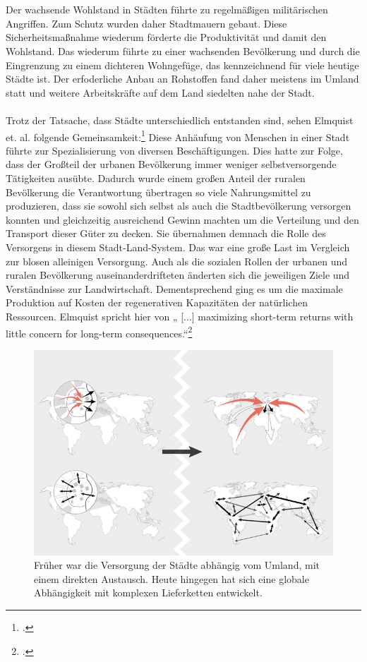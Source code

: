 \documentclass{scrartcl}
\begin{document}
\\
\\
Der wachsende Wohlstand in Städten führte zu regelmäßigen militärischen Angriffen. Zum Schutz wurden daher Stadtmauern gebaut. Diese Sicherheitsmaßnahme wiederum förderte die Produktivität und damit den Wohlstand. Das wiederum führte zu einer wachsenden Bevölkerung und durch die Eingrenzung zu einem dichteren Wohngefüge, das kennzeichnend für viele heutige Städte ist. Der erfoderliche Anbau an Rohstoffen fand daher meistens im Umland statt und weitere Arbeitskräfte auf dem Land siedelten nahe der Stadt. \\
\\
Trotz der Tatsache, dass Städte unterschiedlich entstanden sind, sehen Elmquist et. al. folgende Gemeinsamkeit:\footcite[Vgl.][S.19ff]{Elmqvist2013} Diese Anhäufung von Menschen in einer Stadt führte zur Spezialisierung von diversen Beschäftigungen. Dies hatte zur Folge, dass der Großteil der urbanen Bevölkerung immer weniger selbstversorgende Tätigkeiten ausübte. Dadurch wurde einem großen Anteil der ruralen Bevölkerung die Verantwortung übertragen so viele Nahrungsmittel zu produzieren, dass sie sowohl sich selbst als auch die Stadtbevölkerung versorgen konnten und gleichzeitig ausreichend Gewinn machten um die Verteilung und den Transport dieser Güter zu decken. Sie übernahmen demnach die Rolle des Versorgens in diesem Stadt-Land-System. Das war eine große Last im Vergleich zur blosen alleinigen Versorgung. Auch als die sozialen Rollen der urbanen und ruralen Bevölkerung auseinanderdrifteten änderten sich die jeweiligen Ziele und Verständnisse zur Landwirtschaft. Dementsprechend ging es um die maximale Produktion auf Kosten der regenerativen Kapazitäten der natürlichen Ressourcen. Elmquist spricht hier von  „ [...] maximizing short-term returns with little concern for long-term consequences.“\footcite[S.20]{Elmqvist2013}

\begin{figure}[h]
\centering
\includegraphics[width=12cm]{image_folder/connections_1.jpg}
\caption{Früher war die Versorgung der Städte abhängig vom Umland, mit einem direkten Austausch. Heute hingegen hat sich eine globale Abhängigkeit mit komplexen Lieferketten entwickelt.}
\label{fig:verbindungen}
\end{figure}
\end{document}
